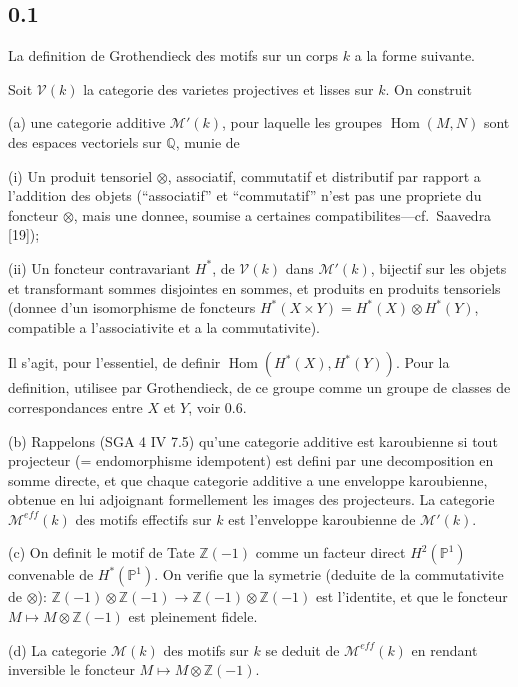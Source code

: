 \documentclass[12pt,a4paper]{article}
\theoremstyle{plain}
\theoremstyle{definition}
\theoremstyle{remark}
\DeclareMathOperator{\Hom}{Hom}
\newcommand{\Q}{\mathbb{Q}}
\newcommand{\Z}{\mathbb{Z}}
\newcommand{\PP}{\mathbb{P}}
\begin{document}
\subsection*{0.1}

La definition de Grothendieck des motifs sur un corps $k$ a la forme suivante.

Soit $\mathcal{V}(k)$ la categorie des varietes projectives et lisses sur $k$. On construit

(a) une categorie additive $\mathcal{M}'(k)$, pour laquelle les groupes $\Hom(M, N)$ sont des
espaces vectoriels sur $\Q$, munie de

\quad (i) Un produit tensoriel $\otimes$, associatif, commutatif et distributif par rapport a
l'addition des objets (``associatif'' et ``commutatif'' n'est pas une propriete du foncteur
$\otimes$, mais une donnee, soumise a certaines compatibilites---cf.~Saavedra [19]);

\quad (ii) Un foncteur contravariant $H^*$, de $\mathcal{V}(k)$ dans $\mathcal{M}'(k)$, bijectif sur les objets et
transformant sommes disjointes en sommes, et produits en produits tensoriels
(donnee d'un isomorphisme de foncteurs $H^*(X \times Y) = H^*(X) \otimes H^*(Y)$,
compatible a l'associativite et a la commutativite).

Il s'agit, pour l'essentiel, de definir $\Hom(H^*(X), H^*(Y))$. Pour la definition, utilisee
par Grothendieck, de ce groupe comme un groupe de classes de correspondances
entre $X$ et $Y$, voir 0.6.

(b) Rappelons (SGA 4 IV 7.5) qu'une categorie additive est karoubienne si tout
projecteur (= endomorphisme idempotent) est defini par une decomposition en
somme directe, et que chaque categorie additive a une enveloppe karoubienne,
obtenue en lui adjoignant formellement les images des projecteurs. La categorie
$\mathcal{M}^{eff}(k)$ des motifs effectifs sur $k$ est l'enveloppe karoubienne de $\mathcal{M}'(k)$.

(c) On definit le motif de Tate $\Z(-1)$ comme un facteur direct $H^2(\PP^1)$ convenable
de $H^*(\PP^1)$. On verifie que la symetrie (deduite de la commutativite de $\otimes$):
$\Z(-1) \otimes \Z(-1) \to \Z(-1) \otimes \Z(-1)$ est l'identite, et que le foncteur
$M \mapsto M \otimes \Z(-1)$ est pleinement fidele.

(d) La categorie $\mathcal{M}(k)$ des motifs sur $k$ se deduit de $\mathcal{M}^{eff}(k)$ en rendant inversible
le foncteur $M \mapsto M \otimes \Z(-1)$.
\end{document}
